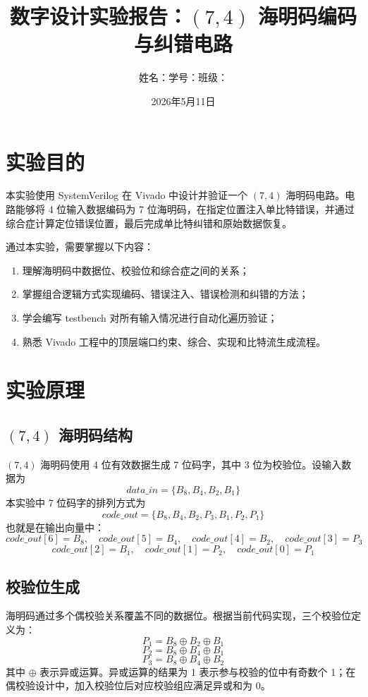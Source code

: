 ﻿\documentclass[UTF8,a4paper,12pt]{ctexart}
\title{数字设计实验报告：$(7,4)$ 海明码编码与纠错电路}
\author{姓名：\underline{\hspace{2.4cm}}\quad 学号：\underline{\hspace{3.2cm}}\quad 班级：\underline{\hspace{2.4cm}}}
\date{2026年5月11日}
\begin{document}
\maketitle

\section{实验目的}

本实验使用 SystemVerilog 在 Vivado 中设计并验证一个 $(7,4)$ 海明码电路。电路能够将 4 位输入数据编码为 7 位海明码，在指定位置注入单比特错误，并通过综合症计算定位错误位置，最后完成单比特纠错和原始数据恢复。

通过本实验，需要掌握以下内容：
\begin{enumerate}
  \item 理解海明码中数据位、校验位和综合症之间的关系；
  \item 掌握组合逻辑方式实现编码、错误注入、错误检测和纠错的方法；
  \item 学会编写 testbench 对所有输入情况进行自动化遍历验证；
  \item 熟悉 Vivado 工程中的顶层端口约束、综合、实现和比特流生成流程。
\end{enumerate}

\section{实验原理}

\subsection{$(7,4)$ 海明码结构}

$(7,4)$ 海明码使用 4 位有效数据生成 7 位码字，其中 3 位为校验位。设输入数据为
\[
data\_in = \{B_8,B_4,B_2,B_1\}
\]
本实验中 7 位码字的排列方式为
\[
code\_out = \{B_8,B_4,B_2,P_3,B_1,P_2,P_1\}
\]
也就是在输出向量中：
\[
code\_out[6]=B_8,\quad code\_out[5]=B_4,\quad code\_out[4]=B_2,\quad code\_out[3]=P_3
\]
\[
code\_out[2]=B_1,\quad code\_out[1]=P_2,\quad code\_out[0]=P_1
\]

\subsection{校验位生成}

海明码通过多个偶校验关系覆盖不同的数据位。根据当前代码实现，三个校验位定义为：
\[
P_1 = B_8 \oplus B_2 \oplus B_1
\]
\[
P_2 = B_8 \oplus B_4 \oplus B_1
\]
\[
P_3 = B_8 \oplus B_4 \oplus B_2
\]
其中 $\oplus$ 表示异或运算。异或运算的结果为 1 表示参与校验的位中有奇数个 1；在偶校验设计中，加入校验位后对应校验组应满足异或和为 0。
\end{document}
